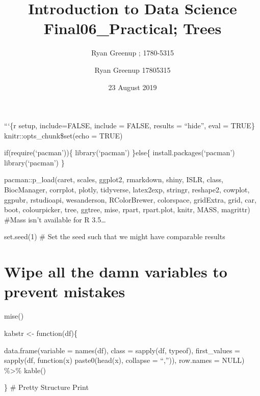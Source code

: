 \documentclass[12pt]{article}
\title{\color{coltit} \Huge Introduction to Data Science Final}
\author{Ryan Greenup ; 1780-5315}
\title{06\_Practical; Trees}
\author{Ryan Greenup 17805315}
\date{23 August 2019}
\begin{document}
\maketitle

```\{r setup, include=FALSE, include = FALSE, results = ``hide'', eval =
TRUE\} knitr::opts\_chunk\$set(echo = TRUE)

if(require(`pacman'))\{ library(`pacman') \}else\{
install.packages(`pacman') library(`pacman') \}

pacman::p\_load(caret, scales, ggplot2, rmarkdown, shiny, ISLR, class,
BiocManager, corrplot, plotly, tidyverse, latex2exp, stringr, reshape2,
cowplot, ggpubr, rstudioapi, wesanderson, RColorBrewer, colorspace,
gridExtra, grid, car, boot, colourpicker, tree, ggtree, mise, rpart,
rpart.plot, knitr, MASS, magrittr) \#Mass isn't available for R
3.5\ldots{}

set.seed(1) \# Set the seed such that we might have comparable results

\hypertarget{wipe-all-the-damn-variables-to-prevent-mistakes}{%
\section{Wipe all the damn variables to prevent
mistakes}\label{wipe-all-the-damn-variables-to-prevent-mistakes}}

mise()

kabstr \textless- function(df)\{

data.frame(variable = names(df), class = sapply(df, typeof),
first\_values = sapply(df, function(x) paste0(head(x), collapse =
``,'')), row.names = NULL) \%\textgreater\% kable()

\} \# Pretty Structure Print
\end{document}

